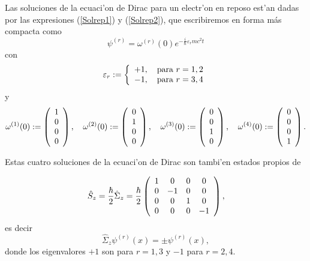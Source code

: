 Las soluciones de la ecuaci'on de Dirac para un electr'on en reposo est'an
dadas por las expresiones (\ref{Solrep1}) y (\ref{Solrep2}), que 
escribiremos en forma m\'{a}s compacta como
\begin{equation}
\psi^{(r)}=\omega^{(r)}(0) e^{-\frac{i}{\hbar}\varepsilon_{r}mc^2t}%
\end{equation}
con
\begin{equation}
\varepsilon_{r}:=\left\{
\begin{array}
[c]{c}%
+1,\quad\text{para }r=1,2\\
-1,\quad\text{para }r=3,4
\end{array}
\right.
\end{equation}
y
\begin{equation}
\omega^{(1)}(0) :=\left(
\begin{array}
[c]{c}%
1\\
0\\
0\\
0
\end{array}
\right),
\quad \omega^{(2)}(0) :=\left(
\begin{array}
[c]{c}%
0\\
1\\
0\\
0
\end{array}
\right),
\quad\omega^{(3)}(0) :=\left(
\begin{array}
[c]{c}%
0\\
0\\
1\\
0
\end{array}
\right),
\quad\omega^{(4)}(0) :=\left(
\begin{array}
[c]{c}%
0\\
0\\
0\\
1
\end{array}
\right).
\end{equation}

Estas cuatro soluciones de la ecuaci'on de Dirac son tambi'en estados propios de

\begin{equation}
\hat{S}_{z}=\frac{\hbar}{2}\hat{\Sigma}_{z}=\frac{\hbar}{2}\left(
\begin{array}
[c]{cccc}%
1 & 0 & 0 & 0\\
0 & -1 & 0 & 0\\
0 & 0 & 1 & 0\\
0 & 0 & 0 & -1
\end{array}
\right),
\end{equation}
es decir
\begin{equation}
\hat{\Sigma}_{z}\psi^{(r)}\left( x\right) =\pm\psi^{(r)}\left( x\right),
\end{equation}
donde los eigenvalores $+1$ son para $r=1,3$ y $-1$ para $r=2,4$.

